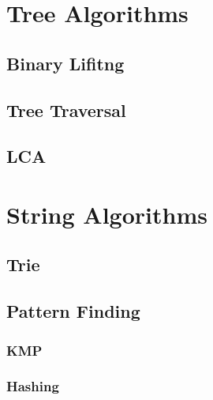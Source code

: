 \documentclass[13pt]{article}
\begin{document}
\section{Tree Algorithms}

\subsection{Binary Lifitng}\label{sub:binary_lifitng} %


\subsection{Tree Traversal}\label{sub:tree_traversal} %


\subsection{LCA}\label{sub:lca} %


\section{String Algorithms}

\subsection{Trie}\label{sub:trie} %


\subsection{Pattern Finding}\label{sub:pattern_finding} %

\subsubsection{KMP}\label{ssub:kmp} %


\subsubsection{Hashing}\label{ssub:hashing} %
\end{document}
